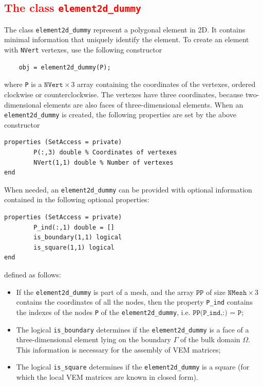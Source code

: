 \documentclass[a4paper]{article}
\newcommand{\red}[1]{\textcolor{red}{#1}}
\begin{document}
\subsection{\red{The class \texttt{element2d\_dummy}}}
The class \texttt{element2d\_dummy} represent a polygonal element in 2D. It contains minimal information that uniquely identify the element. To create an element with \texttt{NVert} vertexes, use the following constructor
\begin{lstlisting}
	obj = element2d_dummy(P);
\end{lstlisting}
where \texttt{P} is a $\texttt{NVert} \times 3$ array containing the coordinates of the vertexes, ordered clockwise or counterclockwise. The vertexes have three coordinates, because two-dimensional elements are also faces of three-dimensional elements. When an \texttt{element2d\_dummy} is created, the following properties are set by the above constructor
\begin{lstlisting}
properties (SetAccess = private)
        P(:,3) double % Coordinates of vertexes
        NVert(1,1) double % Number of vertexes
end
\end{lstlisting}
When needed, an \texttt{element2d\_dummy} can be provided with optional information contained in the following optional properties:
\begin{lstlisting}
properties (SetAccess = private)
        P_ind(:,1) double = []
        is_boundary(1,1) logical
        is_square(1,1) logical
end
\end{lstlisting}
defined as follows:
\begin{itemize}
\item If the \texttt{element2d\_dummy} is part of a mesh, and the array $\texttt{PP}$ of size $\texttt{NMesh} \times 3$ contains the coordinates of all the nodes, then the property \texttt{P\_ind} contains the indexes of the nodes \texttt{P} of the \texttt{element2d\_dummy}, i.e. $\texttt{PP(P\_ind,:) = P}$;
\item The logical \texttt{is\_boundary} determines if the \texttt{element2d\_dummy} is a face of a three-dimensional element lying on the boundary $\Gamma$ of the bulk domain $\Omega$. This information is necessary for the assembly of VEM matrices; 
\item The logical \texttt{is\_square} determines if the \texttt{element2d\_dummy} is a square (for which the local VEM matrices are known in closed form).
\end{itemize}
\end{document}
